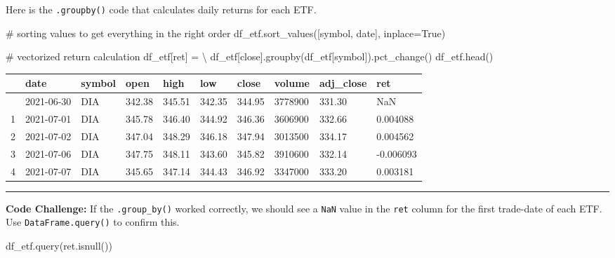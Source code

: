 \documentclass[
  letterpaper,
  DIV=11,
  numbers=noendperiod]{scrreprt}
\newenvironment{Shaded}{\begin{snugshade}}{\end{snugshade}}
\newcommand{\CommentTok}[1]{\textcolor[rgb]{0.37,0.37,0.37}{#1}}
\newcommand{\NormalTok}[1]{\textcolor[rgb]{0.00,0.23,0.31}{#1}}
\newcommand{\OperatorTok}[1]{\textcolor[rgb]{0.37,0.37,0.37}{#1}}
\newcommand{\StringTok}[1]{\textcolor[rgb]{0.13,0.47,0.30}{#1}}
\newcommand{\VariableTok}[1]{\textcolor[rgb]{0.07,0.07,0.07}{#1}}
\begin{document}
Here is the \texttt{.groupby()} code that calculates daily returns for
each ETF.

\begin{Shaded}
\begin{Highlighting}[]
\CommentTok{\# sorting values to get everything in the right order}
\NormalTok{df\_etf.sort\_values([}\StringTok{\textquotesingle{}symbol\textquotesingle{}}\NormalTok{, }\StringTok{\textquotesingle{}date\textquotesingle{}}\NormalTok{], inplace}\OperatorTok{=}\VariableTok{True}\NormalTok{)}

\CommentTok{\# vectorized return calculation}
\NormalTok{df\_etf[}\StringTok{\textquotesingle{}ret\textquotesingle{}}\NormalTok{] }\OperatorTok{=} \OperatorTok{\textbackslash{}}
\NormalTok{    df\_etf[}\StringTok{\textquotesingle{}close\textquotesingle{}}\NormalTok{].groupby(df\_etf[}\StringTok{\textquotesingle{}symbol\textquotesingle{}}\NormalTok{]).pct\_change()}
\NormalTok{df\_etf.head()}
\end{Highlighting}
\end{Shaded}

\begin{longtable}[]{@{}llllllllll@{}}
\toprule\noalign{}
& date & symbol & open & high & low & close & volume & adj\_close &
ret \\
\midrule\noalign{}
\endhead
\bottomrule\noalign{}
\endlastfoot
0 & 2021-06-30 & DIA & 342.38 & 345.51 & 342.35 & 344.95 & 3778900 &
331.30 & NaN \\
1 & 2021-07-01 & DIA & 345.78 & 346.40 & 344.92 & 346.36 & 3606900 &
332.66 & 0.004088 \\
2 & 2021-07-02 & DIA & 347.04 & 348.29 & 346.18 & 347.94 & 3013500 &
334.17 & 0.004562 \\
3 & 2021-07-06 & DIA & 347.75 & 348.11 & 343.60 & 345.82 & 3910600 &
332.14 & -0.006093 \\
4 & 2021-07-07 & DIA & 345.65 & 347.14 & 344.43 & 346.92 & 3347000 &
333.20 & 0.003181 \\
\end{longtable}

\begin{center}\rule{0.5\linewidth}{0.5pt}\end{center}

\textbf{Code Challenge:} If the \texttt{.group\_by()} worked correctly,
we should see a \texttt{NaN} value in the \texttt{ret} column for the
first trade-date of each ETF. Use \texttt{DataFrame.query()} to confirm
this.

\begin{Shaded}
\begin{Highlighting}[]
\NormalTok{df\_etf.query(}\StringTok{\textquotesingle{}ret.isnull()\textquotesingle{}}\NormalTok{)}
\end{Highlighting}
\end{Shaded}
\end{document}
